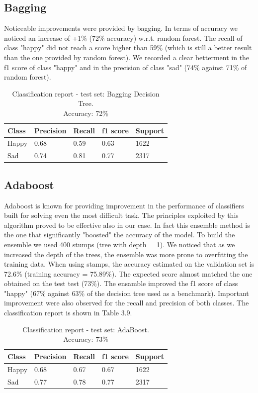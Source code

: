 \subsection{Bagging}

Noticeable improvements were provided by bagging. In terms of accuracy we noticed an increase of +1\% (72\% accuracy) w.r.t. random forest. The recall of class "happy" did not reach a score higher than 59\% (which is still a better result than the one provided by random forest). We recorded a clear betterment in the f1 score of class "happy" and in the precision of class "sad" (74\% against 71\% of random forest). 

\begin{table}[!htb]
\centering
\begin{tabular}{lllll}
\hline
\textbf{Class} & \textbf{Precision} & \textbf{Recall} & \textbf{f1 score} & \textbf{Support} \\ \hline
Happy & 0.68      & 0.59   & 0.63     & 1622    \\ \hline
Sad   & 0.74      & 0.81   & 0.77     & 2317   
\end{tabular}
\caption{Classification report - test set: Bagging Decision Tree.\\ 
Accuracy: 72\%}
\label{Classification report: Bagging Decision Tree}
\end{table}


\subsection{Adaboost}
Adaboost is known for providing improvement in the performance of classifiers built for solving even the most difficult task. The principles exploited by this algorithm proved to be effective also in our case. In fact this ensemble method is the one that significantly "boosted" the accuracy of the model. To build the ensemble we used 400 stumps (tree with depth = 1). We noticed that as we increased the depth of the trees, the ensemble was more prone to overfitting the training data. When using stamps, the accuracy estimated on the validation set is 72.6\% (training accuracy = 75.89\%). The expected score almost matched the one obtained on the test test (73\%). The ensamble improved the f1 score of class "happy" (67\% against 63\% of the decision tree used as a benchmark). Important improvement were also observed for the recall and precision of both classes. The classification report is shown in Table 3.9.  

\begin{table}[!htb]
\centering
\begin{tabular}{lllll}
\hline
\textbf{Class} & \textbf{Precision} & \textbf{Recall} & \textbf{f1 score} & \textbf{Support} \\ \hline
Happy & 0.68      & 0.67   & 0.67     & 1622    \\ \hline
Sad   & 0.77      & 0.78   & 0.77     & 2317   
\end{tabular}
\caption{Classification report - test set: AdaBoost.\\Accuracy: 73\%}
\label{Classification report: AdaBoost}
\end{table}

